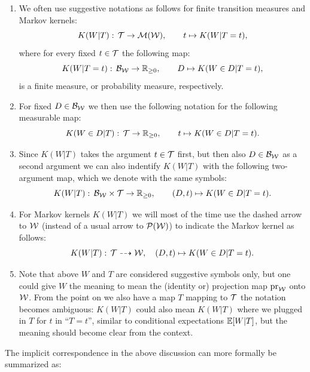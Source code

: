 \begin{Not}
    \begin{enumerate}
        \item We often use suggestive notations as follows for finite transition measures and Markov kernels:
            \[ K(W|T):\, \mathcal{T} \to \mathcal{M}(\mathcal{W}),\qquad t \mapsto K(W|T=t),  \]
            where for every fixed $t \in \mathcal{T}$ the following map: 
            \[ K(W|T=t):\, \mathcal{B}_{\mathcal{W}} \to \mathbb{R}_{\ge0}, \qquad D \mapsto K(W \in D|T=t),\]
            is a finite measure, or probability measure, respectively.
        \item For fixed $D \in \mathcal{B}_{\mathcal{W}}$ we then use the following notation for the following measurable map:
            \[ K(W \in D|T):\, \mathcal{T} \to \mathbb{R}_{\ge0} ,\qquad t \mapsto K(W \in D|T=t).  \]
        \item Since $K(W|T)$ takes the argument $t \in \mathcal{T}$ first, but then also $D \in \mathcal{B}_{\mathcal{W}}$ as a second argument 
            we can also indentify $K(W|T)$ with 
            the following two-argument map, which we denote with the same symbols:
            \[ K(W|T):\, \mathcal{B}_{\mathcal{W}} \times \mathcal{T} \to \mathbb{R}_{\ge 0}, \qquad (D,t) \mapsto K(W \in D|T=t).  \]
        \item For Markov kernels $K(W|T)$ we will most of the time use the dashed arrow to $\mathcal{W}$ (instead of a usual arrow to $\mathcal{P}(\mathcal{W})$) to indicate the Markov kernel as follows:
    \[ K(W|T):\, \mathcal{T} \dashrightarrow \mathcal{W},\quad (D,t) \mapsto K(W \in D|T=t).  \]
\item Note that above $W$ and $T$ are considered suggestive symbols only, but one could give $W$ the meaning to mean the (identity or) projection map 
    $\mathrm{pr}_{\mathcal{W}}$ onto $\mathcal{W}$. 
    From the point on we also have a map $T$ mapping to $\mathcal{T}$ the notation becomes ambiguous: $K(W|T)$ could also mean $K(W|T)$ where we plugged in $T$ for $t$ in ``$T=t$'',
     similar to conditional expectations $\mathbb{E}[W|T]$, but the meaning should become clear from the context.
     \end{enumerate}
\end{Not}

The implicit correspondence in the above discussion can more formally be summarized as:


